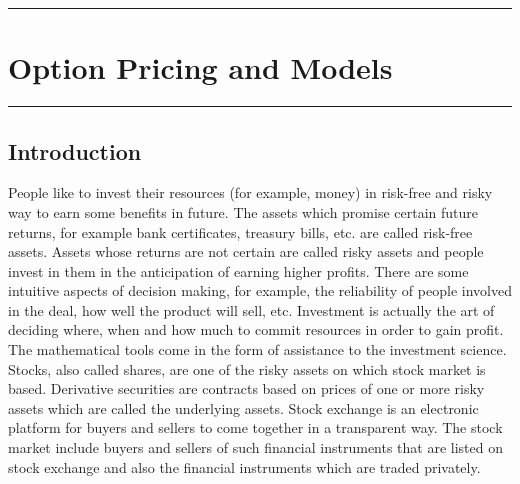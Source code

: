 \documentclass[12pt, a4paper]{report}
\begin{document}
 \clearpage 
\bigskip %

\rule{\textwidth}{1.4pt} %

\bigskip %

\chapter{\textbf{\LARGE Option Pricing and Models}}
\bigskip %

\rule{\textwidth}{1.4pt} %

\bigskip %

\section{Introduction}
People like to invest their resources (for example, money) in risk-free and risky way to earn some benefits in future. The assets which promise certain future returns, for example bank certificates, treasury bills, etc. are called risk-free assets. Assets whose returns are not certain are called risky assets and people invest in them in the anticipation of earning higher profits. There are some intuitive aspects of decision making, for example, the reliability of people involved in the deal, how well the product will sell, etc. Investment is actually the art of deciding where, when and how much to commit resources in order to gain profit. The mathematical tools come in the form of assistance to the investment science. \\

Stocks, also called shares, are one of the risky assets on which stock market is based. Derivative securities are contracts based on prices of one or more risky assets which are called the underlying assets. Stock exchange is an electronic platform for buyers and sellers to come together in a transparent way. The stock market include buyers and sellers of such financial instruments that are listed on stock exchange and also the financial instruments which are traded privately.\\
\end{document}
